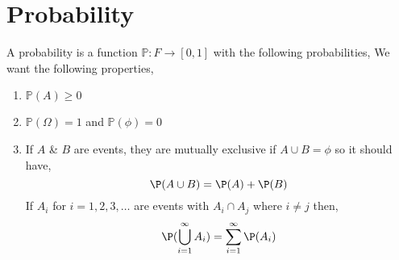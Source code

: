 \section{Probability}
\begin{definition}
A probability is a function  $\mathbb{P}: F \rightarrow [0, 1]$ with the following probabilities, We want the following properties, 
    \begin{enumerate}
        \item $\mathbb{P}(A) \ge 0$
        \item  $\mathbb{P}(\Omega) = 1$ and  $\mathbb{P}(\phi) = 0$
        

        \item If $A$ \& $B$ are events, they are mutually exclusive if  $A \cup B = \phi$ so it should have, 
        $$ \P(A \cup B) = \P(A)  + \P(B) $$ 
        If $A_i$ for  $i = 1,2,3,\dots$ are events with  $A_i \cap A_j$ where  $i \ne j$ then,  
            $$ \P(\bigcup_{i = 1}^{\infty} A_i)  = \sum_{i=1}^{\infty} \P(A_i)$$

    \end{enumerate}
\end{definition}


